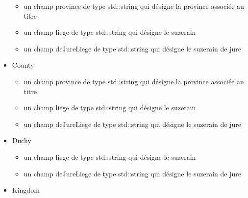 \documentclass[a4paper,12pt]{article}
\begin{document}
\begin{itemize}
\begin{itemize}
\item un champ province de type std::string qui désigne la province associée au titre
\item un champ liege de type std::string qui désigne le suzerain
\item un champ deJureLiege de type std::string qui désigne le suzerain de jure
\end{itemize}
\item County\\
\begin{itemize}
\item un champ province de type std::string qui désigne la province associée au titre
\item un champ liege de type std::string qui désigne le suzerain
\item un champ deJureLiege de type std::string qui désigne le suzerain de jure
\end{itemize}

\item Duchy\\
\begin{itemize}
\item un champ liege de type std::string qui désigne le suzerain
\item un champ deJureLiege de type std::string qui désigne le suzerain de jure
\end{itemize}
\item Kingdom\\


\end{itemize}
\end{document}
